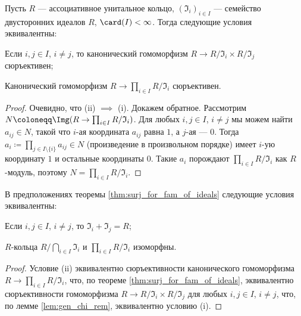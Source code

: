 \documentclass[
	extrafontsizes,
	11pt,
	hyphens,
]{memoir}
\begin{document}
\begin{theorem}
Пусть $R$ --- ассоциативное унитальное кольцо,
$(\mathfrak{I}_i)_{i \in I}$ --- семейство двусторонних идеалов $R$,
$\card(I) < \infty$.
Тогда следующие условия эквивалентны:
\begin{enumerate*}[label={\textup{(\roman*)}}]
	\item
	Если $i,j \in I$, $i \neq j$, то канонический гомоморфизм $R \to R/\mathfrak{I}_i \times R/\mathfrak{I}_j$ сюръективен;
	\item Канонический гомоморфизм $R \to \prod_{i \in I} R/\mathfrak{I}_i$ сюръективен.
\end{enumerate*}
\label{thm:surj_for_fam_of_ideals}
\end{theorem}

\begin{proof}
Очевидно, что (ii) $\implies$ (i).
Докажем обратное.
Рассмотрим $N \coloneqq \Img(R \to \prod_{i \in I} R/\mathfrak{I}_i)$. Для любых $i,j \in I$, $i \neq j$ мы можем найти $a_{ij} \in N$, такой что $i$-ая координата $a_{ij}$ равна $1$, а $j$-ая --- $0$. Тогда $a_i \coloneqq \prod_{j \in I \setminus \{i\}} a_{ij} \in N$ (произведение в произвольном порядке) имеет $i$-ую координату $1$ и остальные координаты $0$. Такие $a_i$ порождают $\prod_{i \in I} R/\mathfrak{I}_i$ как $R$-модуль, поэтому $N = \prod_{i \in I} R/\mathfrak{I}_i$.
\end{proof}

\begin{corollary}
В предположениях теоремы \ref{thm:surj_for_fam_of_ideals} следующие условия эквивалентны:
\begin{enumerate*}[label={\textup{(\roman*)}}]
    \item Если $i,j \in I$, $i \neq j$, то $\mathfrak{I}_i + \mathfrak{I}_j = R$;
    \item
	\(R\)-кольца \(R / \bigcap_{i \in I} \mathfrak{I}_i \) и \(\prod_{i \in I} R / \mathfrak{I}_i\) изоморфны.
\end{enumerate*}
\end{corollary}

\begin{proof}
Условие (ii) эквивалентно сюръективности канонического гомоморфизма $R \to \prod_{i \in I} R/\mathfrak{I}_i$, что, по теореме \ref{thm:surj_for_fam_of_ideals}, эквивалентно сюръективности гомоморфизма $R \to R/\mathfrak{I}_i \times R/\mathfrak{I}_j$ для любых $i,j \in I$, $i \neq j$, что, по лемме \ref{lem:gen_chi_rem}, эквивалентно условию (i).
\end{proof}
\end{document}

